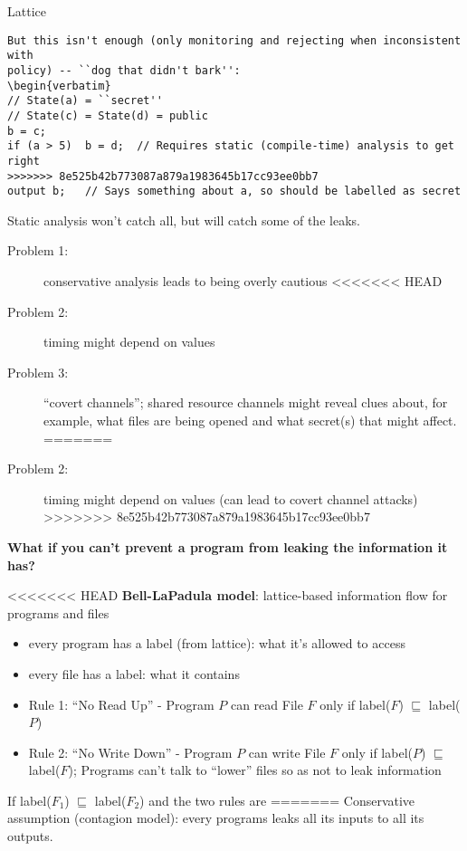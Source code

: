 \begin{definition}{Lattice}
\begin{verbatim}
But this isn't enough (only monitoring and rejecting when inconsistent with
policy) -- ``dog that didn't bark'':
\begin{verbatim}
// State(a) = ``secret''
// State(c) = State(d) = public
b = c;
if (a > 5)  b = d;  // Requires static (compile-time) analysis to get right
>>>>>>> 8e525b42b773087a879a1983645b17cc93ee0bb7
output b;   // Says something about a, so should be labelled as secret
\end{verbatim}
Static analysis won't catch all, but will catch some of the leaks.
\begin{description}
    \item[Problem 1:] conservative analysis leads to being overly cautious
<<<<<<< HEAD
    \item[Problem 2:] timing might depend on values
    \item[Problem 3:] ``covert channels''; shared resource channels might reveal clues about, for example, what files are being opened and what secret(s) that might affect.
=======
    \item[Problem 2:] timing might depend on values (can lead to covert channel attacks)
>>>>>>> 8e525b42b773087a879a1983645b17cc93ee0bb7
\end{description}

{\bf What if you can't prevent a program from leaking the information it has?}

<<<<<<< HEAD
{\bf Bell-LaPadula model}: lattice-based information flow for programs and files
\begin{itemize}
\item every program has a label (from lattice): what it's allowed to access
\item every file has a label: what it contains
\item Rule 1: ``No Read Up'' - Program $P$ can read File $F$ only if label($F$)
    $\sqsubseteq$ label($P$)
\item Rule 2: ``No Write Down'' - Program $P$ can write File $F$ only if
    label($P$) $\sqsubseteq$ label($F$); Programs can't talk to ``lower'' files so as
    not to leak information
\end{itemize}
\begin{theorem*} If label($F_1$) $\sqsubseteq$ label($F_2$) and the two rules are
=======
Conservative assumption (contagion model): every programs leaks all its inputs to all its outputs. 


\end{theorem*}
\end{definition}
